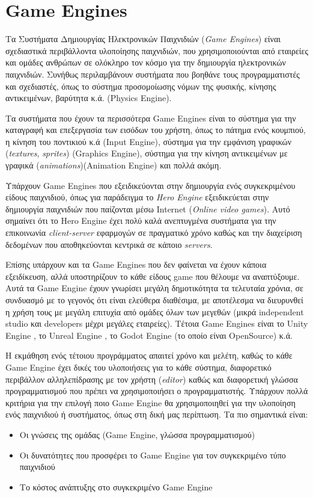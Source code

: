 \section{Game Engines}
Τα Συστήματα Δημιουργίας Ηλεκτρονικών Παιχνιδιών (\textit{Game Engines}) είναι σχεδιαστικά περιβάλλοντα υλοποίησης παιχνιδιών, που χρησιμοποιούνται από εταιρείες και ομάδες ανθρώπων σε ολόκληρο τον κόσμο για την δημιουργία ηλεκτρονικών παιχνιδιών. Συνήθως περιλαμβάνουν συστήματα που βοηθάνε τους προγραμματιστές και σχεδιαστές, όπως το σύστημα προσομοίωσης νόμων της φυσικής, κίνησης αντικειμένων, βαρύτητα κ.ά. (Physics Engine). \cite{gameengine}
\par
Τα συστήματα που έχουν τα περισσότερα Game Engines είναι το σύστημα για την καταγραφή και επεξεργασία των εισόδων του χρήστη, όπως το πάτημα ενός κουμπιού, η κίνηση του ποντικιού κ.ά (Input Engine), σύστημα για την εμφάνιση γραφικών (\textit{textures}, \textit{sprites}) (Graphics Engine), σύστημα για την κίνηση αντικειμένων με γραφικά (\textit{animations})(Animation Engine) και πολλά ακόμη.
\par
Υπάρχουν Game Engines που εξειδικεύονται στην δημιουργία ενός συγκεκριμένου είδους παιχνιδιού, όπως για παράδειγμα το \textit{Hero Engine} εξειδικεύεται στην δημιουργία παιχνιδιών που παίζονται μέσω Internet (\textit{Online video games}). Αυτό σημαίνει ότι το Hero Engine έχει πολύ καλά ανεπτυγμένα συστήματα για την επικοινωνία \textit{client-server} εφαρμογών σε πραγματικό χρόνο καθώς και την διαχείριση δεδομένων που αποθηκεύονται κεντρικά σε κάποιο \textit{servers}.
\par
Επίσης υπάρχουν και τα Game Engines που δεν φαίνεται να έχουν κάποια εξειδίκευση, αλλά υποστηρίζουν το κάθε είδους game που θέλουμε να αναπτύξουμε. Αυτά τα Game Engine έχουν γνωρίσει μεγάλη δημοτικότητα τα τελευταία χρόνια, σε συνδυασμό με το γεγονός ότι είναι ελεύθερα διαθέσιμα, με αποτέλεσμα να διευρυνθεί η χρήση τους με μεγάλη επιτυχία από ομάδες όλων των μεγεθών (μικρά independent studio και developers μέχρι μεγάλες εταιρείες). Τέτοια Game Engines είναι το Unity Engine \cite{unity}, το Unreal Engine \cite{unreal}, το Godot Engine (το οποίο είναι OpenSource) \cite{godot} κ.ά.
\par
Η εκμάθηση ενός τέτοιου προγράμματος απαιτεί χρόνο και μελέτη, καθώς το κάθε Game Engine έχει δικές του υλοποιήσεις για το κάθε σύστημα, διαφορετικό περιβάλλον αλληλεπίδρασης με τον χρήστη (\textit{editor}) καθώς και διαφορετική γλώσσα προγραμματισμού που πρέπει να χρησιμοποιήσει ο προγραμματιστής. Υπάρχουν πολλά κριτήρια για την επιλογή ποιο Game Engine θα χρησιμοποιηθεί για την υλοποίηση ενός παιχνιδιού ή συστήματος, όπως στη δική μας περίπτωση. Τα πιο σημαντικά είναι:
\begin{itemize}
  \item Οι γνώσεις της ομάδας (Game Engine, γλώσσα προγραμματισμού)
  \item Οι δυνατότητες που προσφέρει το Game Engine για τον συγκεκριμένο τύπο παιχνιδιού
  \item Το κόστος ανάπτυξης στο συγκεκριμένο Game Engine
\end{itemize}

